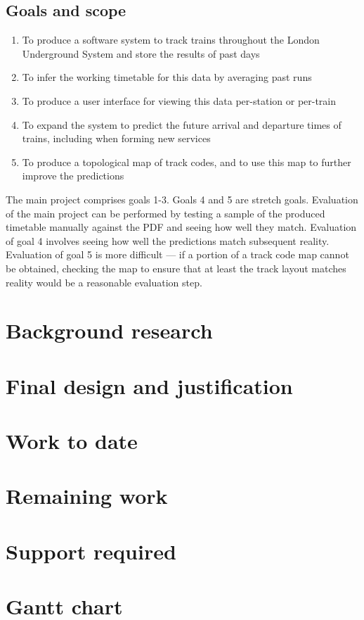 \documentclass[a4paper,12pt]{article}
\begin{document}
\subsection*{Goals and scope}

\begin{enumerate}
  \item To produce a software system to track trains throughout the London
    Underground System and store the results of past days
  \item To infer the working timetable for this data by averaging past runs
  \item To produce a user interface for viewing this data per-station or
    per-train
  \item To expand the system to predict the future arrival and departure times
    of trains, including when forming new services
  \item To produce a topological map of track codes, and to use this map to
    further improve the predictions
\end{enumerate}

The main project comprises goals 1-3. Goals 4 and 5 are stretch goals.
Evaluation of the main project can be performed by testing a sample of the
produced timetable manually against the PDF and seeing how well they match.
Evaluation of goal 4 involves seeing how well the predictions match subsequent
reality. Evaluation of goal 5 is more difficult --- if a portion of a track
code map cannot be obtained, checking the map to ensure that at least the track
layout matches reality would be a reasonable evaluation step.

\section*{Background research}

\section*{Final design and justification}

\section*{Work to date}

\section*{Remaining work}

\section*{Support required}

\section*{Gantt chart}
\end{document}
